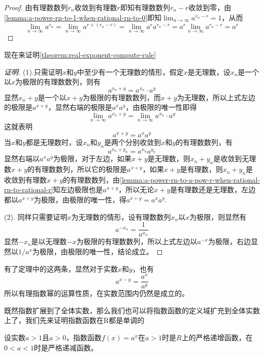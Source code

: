 \begin{proof}
  由有理数数列$r_n$收敛到有理数$r$即知有理数数列$r_n-r$收敛到零，由\autoref{lemma:a-power-rn-to-1-when-rational-rn-to-0}即知$\lim_{n \to \infty}a^{r_n-r} = 1$，从而
  \[ \lim_{n \to \infty} a^{r_n} = \lim_{n \to \infty} a^{r+(r_n-r)} = \lim_{n \to \infty} a^ra^{r_n-r} = a^r \lim_{n \to \infty}a^{r_n-r} = a^r \]
\end{proof}

现在来证明\autoref{theorem:real-exponent-compute-rule}
\begin{proof}[证明]
  (1).只需证明$x$和$y$中至少有一个无理数的情形，假定$x$是无理数，设$x_n$是一个以$x$为极限的有理数数列，则有
  \[ a^{x_n+y} = a^{x_n} \cdot a^y \]
  显然$x_n+y$是一个以$x+y$为极限的有理数数列，而$x+y$为无理数，所以上式左边的极限是$a^{x+y}$，显然右端的极限是$a^xa^y$，由极限的唯一性即得
  \[ \lim_{n \to \infty}a^{x_n+y} = \lim_{n \to \infty}a^{x_n} \cdot a^y \]
  这就表明
  \[ a^{x+y} = a^xa^y \]
  当$x$和$y$都是无理数时，设$x_n$和$y_n$是两个分别收敛到$x$和$y$的有理数数列，有
  \[ a^{x_n+y_n} = a^{x_n}a^{y_n} \]
  显然右端以$a^xa^y$为极限，对于左边，如果$x+y$是无理数，则$x_n+y_n$是收敛到无理数$x+y$的有理数数列，所以它的极限是$a^{x+y}$，如果$x+y$是有理数，则$x_n+y_n$是收敛到有理数$x+y$的有理数数列，由\autoref{lemma:a-power-rn-to-a-pow-r-when-rational-rn-to-rational-r}知左边极限也是$a^{x+y}$，所以无论$x+y$是有理数还是无理数，左边都以$a^{x+y}$为极限，由极限的唯一性，得$a^{x+y}=a^xa^y$.

  (2). 同样只需要证明$x$为无理数的情形，设有理数数列$x_n$以$x$为极限，则显然有
  \[ a^{-x_n} = \frac{1}{a^{x_n}} \]
  显然$-x_n$是以无理数$-x$为极限的有理数数列，所以上式左边以$a^{-x}$为极限，右边显然以$1/a^x$为极限，由极限的唯一性，结论成立。
\end{proof}

有了定理中的这两条，显然对于实数$x$和$y$，也有
\[ a^{x-y} = \frac{a^x}{a^y} \]
所以有理指数幂的运算性质，在实数范围内仍然是成立的。

既然指数扩展到了全体实数，那么我们也可以将指数函数的定义域扩充到全体实数上了，我们先来证明指数函数在R都是单调的

\begin{theorem}
  设实数$a>1$且$a>0$，指数函数$f(x)=a^x$在$a>1$时是$R$上的严格递增函数，在$0<a<1$时是严格递减函数。
\end{theorem}

